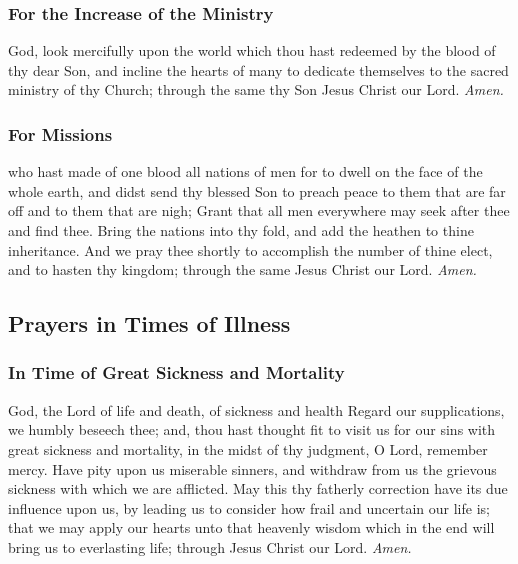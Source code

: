 \subsubsection{For the Increase of the Ministry}
 God, look mercifully upon the world which thou hast redeemed by the blood of thy dear Son, and incline the hearts of many to dedicate themselves to the sacred ministry of thy Church; through the same thy Son Jesus Christ our Lord. \textit{Amen.}
\subsubsection{For Missions}
 who hast made of one blood all nations of men for to dwell on the face of the whole earth, and didst send thy blessed Son to preach peace to them that are far off and to them that are nigh; Grant that all men everywhere may seek after thee and find thee. Bring the nations into thy fold, and add the heathen to thine inheritance. And we pray thee shortly to accomplish the number of thine elect, and to hasten thy kingdom; through the same Jesus Christ our Lord. \textit{Amen.}

\subsection{Prayers in Times of Illness}

\subsubsection{In Time of Great Sickness and Mortality}
 God, the Lord of life and death, of sickness and health Regard our supplications, we humbly beseech thee; and, thou hast thought fit to visit us for our sins with great sickness and mortality, in the midst of thy judgment, O Lord, remember mercy. Have pity upon us miserable sinners, and withdraw from us the grievous sickness with which we are afflicted. May this thy fatherly correction have its due influence upon us, by leading us to consider how frail and uncertain our life is; that we may apply our hearts unto that heavenly wisdom which in the end will bring us to everlasting life; through Jesus Christ our Lord. \textit{Amen.}

